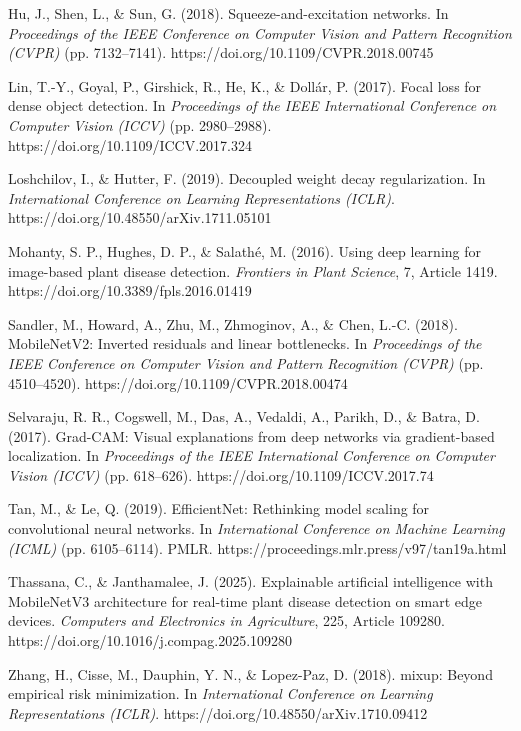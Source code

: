 Hu, J., Shen, L., \& Sun, G. (2018). Squeeze-and-excitation networks. In \textit{Proceedings of the IEEE Conference on Computer Vision and Pattern Recognition (CVPR)} (pp. 7132--7141). https://doi.org/10.1109/CVPR.2018.00745

Lin, T.-Y., Goyal, P., Girshick, R., He, K., \& Dollár, P. (2017). Focal loss for dense object detection. In \textit{Proceedings of the IEEE International Conference on Computer Vision (ICCV)} (pp. 2980--2988). https://doi.org/10.1109/ICCV.2017.324

Loshchilov, I., \& Hutter, F. (2019). Decoupled weight decay regularization. In \textit{International Conference on Learning Representations (ICLR)}. https://doi.org/10.48550/arXiv.1711.05101

Mohanty, S. P., Hughes, D. P., \& Salathé, M. (2016). Using deep learning for image-based plant disease detection. \textit{Frontiers in Plant Science}, 7, Article 1419. https://doi.org/10.3389/fpls.2016.01419

Sandler, M., Howard, A., Zhu, M., Zhmoginov, A., \& Chen, L.-C. (2018). MobileNetV2: Inverted residuals and linear bottlenecks. In \textit{Proceedings of the IEEE Conference on Computer Vision and Pattern Recognition (CVPR)} (pp. 4510--4520). https://doi.org/10.1109/CVPR.2018.00474

Selvaraju, R. R., Cogswell, M., Das, A., Vedaldi, A., Parikh, D., \& Batra, D. (2017). Grad-CAM: Visual explanations from deep networks via gradient-based localization. In \textit{Proceedings of the IEEE International Conference on Computer Vision (ICCV)} (pp. 618--626). https://doi.org/10.1109/ICCV.2017.74

Tan, M., \& Le, Q. (2019). EfficientNet: Rethinking model scaling for convolutional neural networks. In \textit{International Conference on Machine Learning (ICML)} (pp. 6105--6114). PMLR. https://proceedings.mlr.press/v97/tan19a.html

Thassana, C., \& Janthamalee, J. (2025). Explainable artificial intelligence with MobileNetV3 architecture for real-time plant disease detection on smart edge devices. \textit{Computers and Electronics in Agriculture}, 225, Article 109280. https://doi.org/10.1016/j.compag.2025.109280

Zhang, H., Cisse, M., Dauphin, Y. N., \& Lopez-Paz, D. (2018). mixup: Beyond empirical risk minimization. In \textit{International Conference on Learning Representations (ICLR)}. https://doi.org/10.48550/arXiv.1710.09412

\endgroup
